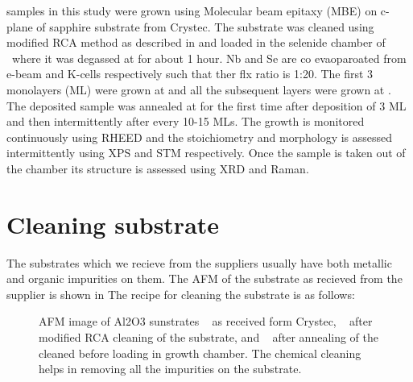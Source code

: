 \label{growth_of_nbse2}

\nbse samples in this study were  grown using Molecular beam epitaxy (MBE) on c-plane 
of sapphire substrate from Crystec. The substrate was cleaned using modified RCA method 
as described in  and loaded in the selenide chamber of \papaya\ 
where it was degassed at  for about 1 hour. Nb and Se are co evaoparoated 
from e-beam and K-cells respectively such that ther flx ratio is 1:20. The first 3 monolayers 
(ML) were grown at \temperature{570} and all the subsequent layers were grown at . 
The deposited sample was annealed at \temperature{700} for the first time after deposition of 3 ML 
and then intermittently after every 10-15 MLs. The growth is monitored continuously using RHEED and 
the stoichiometry and morphology is assessed intermittently using XPS and STM respectively. Once the 
sample is taken out of the chamber its structure is assessed using XRD and Raman.


\section{Cleaning \alumina substrate}

The substrates which we recieve from the suppliers usually have both metallic and organic impurities on them.
The AFM of the substrate as recieved from the supplier is shown in \tref{afm-rec-al2o3} The recipe for cleaning 
the substrate is as follows:

\begin{figure}
   
    \centering
    \caption{
        AFM image of Al2O3 sunstrates 
        \sfA~ as received form Crystec, 
        \sfB~  after modified RCA cleaning of the substrate, and 
        \sfC~  after annealing of the cleaned before loading in growth chamber. 
        The chemical cleaning helps in removing all the impurities on the substrate.
    }
\end{figure}

